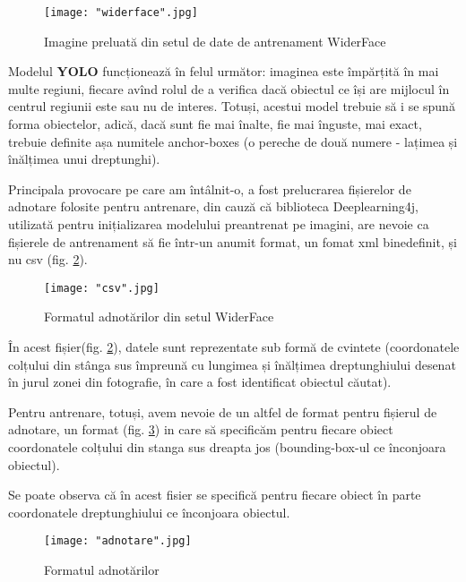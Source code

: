 \documentclass[a4paper, 12pt]{article}
\begin{document}
	\begin{figure}[H]
		\centering
		\texttt{[image: "widerface".jpg]}
		\caption{Imagine preluată din setul de date de antrenament WiderFace}\label{fig::widerface}
	\end{figure} 
	
	\newpage
	
	Modelul \textbf{YOLO} funcționează în felul următor: imaginea este împărțită în mai multe regiuni, fiecare avînd rolul de a verifica dacă obiectul ce își are mijlocul în centrul regiunii este sau nu de interes. Totuși, acestui model trebuie să i se spună forma obiectelor, adică, dacă sunt fie mai înalte, fie mai înguste, mai exact, trebuie definite așa numitele anchor-boxes (o pereche de două numere - lațimea și înălțimea unui dreptunghi).
	
	Principala provocare pe care am întâlnit-o, a fost prelucrarea fișierelor de adnotare folosite pentru antrenare, din cauză că biblioteca Deeplearning4j, utilizată pentru inițializarea modelului preantrenat pe imagini, are nevoie ca fișierele de antrenament să fie într-un anumit format, un fomat xml binedefinit, și nu csv (fig. \ref{fig::csv}).
	
	\begin{figure}[H]
		\centering
		\texttt{[image: "csv".jpg]}
		\caption{Formatul adnotărilor din setul WiderFace}\label{fig::csv}
	\end{figure} 
	
	În acest fișier(fig. \ref{fig::csv}), datele sunt reprezentate sub formă de cvintete (coordonatele colțului din stânga sus împreună cu lungimea și înălțimea dreptunghiului desenat în jurul zonei din fotografie, în care a fost identificat obiectul căutat).
	
	Pentru antrenare, totuși, avem nevoie de un altfel de format pentru fișierul de adnotare, un format (fig. \ref{fig::adnotare}) in care să specificăm pentru fiecare obiect coordonatele colțului din stanga sus dreapta jos (bounding-box-ul ce înconjoara obiectul).
	
	Se poate observa că în acest fisier se specifică pentru fiecare obiect în parte coordonatele dreptunghiului ce înconjoara obiectul.
	
	\begin{figure}[H]
		\centering
		\texttt{[image: "adnotare".jpg]}
		\caption{Formatul adnotărilor}\label{fig::adnotare}
	\end{figure} 
	
\end{document}
